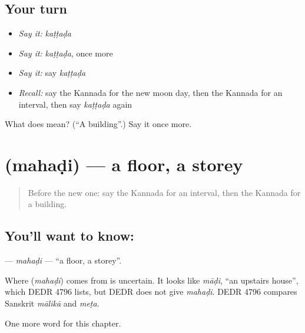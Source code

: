 \subsection*{Your turn}
\begin{itemize}
\raggedright
  \item \emph{Say it:} \emph{kaṭṭaḍa}
  \item \emph{Say it:} \emph{kaṭṭaḍa}, once more
  \item \emph{Say it:} say \emph{kaṭṭaḍa}
  \item \emph{Recall:} say the Kannada for the new moon day, then the Kannada for an interval, then say \emph{kaṭṭaḍa} again
\end{itemize}

\begin{tcolorbox}[breakable,colback=teal!4,colframe=teal!35!black,title={Before you move on}]
What does  mean? (\textquotedblleft{}A building\textquotedblright{}.) Say it once more.
\end{tcolorbox}
\section[\texorpdfstring{\kn{ಮಹಡಿ} (mahaḍi)}{ಮಹಡಿ (mahaḍi)}]{ (mahaḍi) — a floor, a storey}

\label{lesson:KA-C286-mahadi}



\begin{quote}
Before the new one: say the Kannada for an interval, then the Kannada for a building.
\end{quote}

\subsection*{You'll want to know: }
\textbf{} — \emph{mahaḍi} — \textquotedblleft{}a floor, a storey\textquotedblright{}.

\begin{cousinweb}
Where \textbf{} (\emph{mahaḍi}) comes from is uncertain. It looks like \emph{māḍi}, \textquotedblleft{}an upstairs house\textquotedblright{}, which DEDR 4796 lists, but DEDR does not give \emph{mahaḍi}. DEDR 4796 compares Sanskrit \emph{mālikā} and \emph{meṭa}.
\end{cousinweb}

\begin{grammarlens}[title={What you've built}]
One more word for this chapter.
\end{grammarlens}

